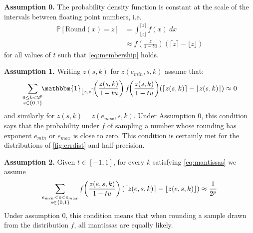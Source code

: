 \documentclass[10pt,conference]{IEEEtran}
\newcommand{\ie}{i.e.\ }
\newcommand{\Pro}[1]{\mathbb{P}\left[ #1 \right]}
\newcommand{\round}{\mathrm{Round}}
\newcommand{\ceil}[1]{\lceil #1 \rceil}
\newcommand{\floor}[1]{\lfloor #1 \rfloor}
\newcommand{\fintvl}[1][x]{\mathlarger{\lfloor}#1,#1\mathlarger{\rceil}}
\newcommand{\one}{\mathbbm{1}}
\begin{document}
\noindent \textbf{Assumption 0.} The probability density function is constant at the scale of the intervals between floating point numbers, \ie
\begin{align*}
\Pro{\round(x)=z}
&=\int_{\floor{z}}^{\ceil{z}} f(x)~dx 
\\
&\approx f\left(\frac{z}{1-tu}\right)(\ceil{z}-\floor{z})
\end{align*}
for all values of $t$ such that \cref{eq:membership} holds.

\noindent  \textbf{Assumption 1.} Writing $z(s,k)$ for $z(e_{min},s,k)$ assume that:
\[
\sum_{\substack{0\leq k<2^p\\ s\in\{0,1\}}}\hspace{-4pt}\one_{\fintvl[z]}\hspace{-4pt}\left(\frac{z(s,k)}{1-tu}\right)f\hspace{-3pt}\left(\frac{z(s,k)}{1-tu}\right)\hspace{-2pt}(\ceil{z(s,k)}-\floor{z(s,k)})\approx 0
\]
and similarly for $z(s,k)=z(e_{max},s,k)$.
Under Assumption 0, this condition says that the probability under $f$ of sampling a number whose rounding has exponent $e_{min}$ or $e_{max}$ is close to zero. This condition is certainly met for the distributions of \cref{fig:errdist} and half-precision.

\noindent \textbf{Assumption 2.} Given $t\in\left[-1,1\right]$, for every $k$ satisfying \cref{eq:mantissas} we assume
\[
\sum_{\substack{e_{min}<e<e_{max}\\ s\in\{0,1\}}}f\hspace{-2pt}\left(\frac{z(e,s,k)}{1-tu}\right)(\ceil{z(e,s,k)}-\floor{z(e,s,k)})\approx \frac{1}{2^p}
\]
Under assumption 0, this condition means that when rounding a sample drawn from the distribution $f$, all mantissas are equally likely.
\end{document}
